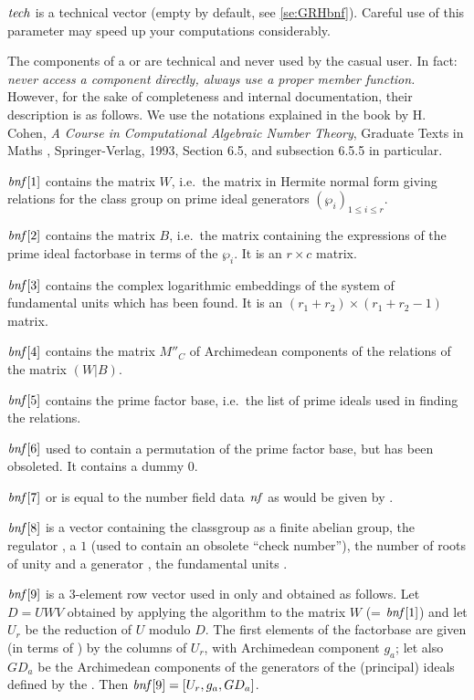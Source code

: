 $\hbox{\it tech\/}$ is a technical vector (empty by default, see \ref{se:GRHbnf}).
Careful use of this parameter may speed up your computations considerably.

\smallskip

The components of a  or  are technical and never used by
the casual user. In fact: \emph{never access a component directly, always use
a proper member function.} However, for the sake of completeness and internal
documentation, their description is as follows. We use the notations
explained in the book by H. Cohen, \emph{A Course in Computational Algebraic
Number Theory}, Graduate Texts in Maths , Springer-Verlag, 1993,
Section 6.5, and subsection 6.5.5 in particular.

$\hbox{\it bnf\/}[1]$ contains the matrix $W$, i.e.~the matrix in Hermite normal
form giving relations for the class group on prime ideal generators
$(\wp_i)_{1\le i\le r}$.

$\hbox{\it bnf\/}[2]$ contains the matrix $B$, i.e.~the matrix containing the
expressions of the prime ideal factorbase in terms of the $\wp_i$. It is an
$r\times c$ matrix.

$\hbox{\it bnf\/}[3]$ contains the complex logarithmic embeddings of the system of
fundamental units which has been found. It is an $(r_1+r_2)\times(r_1+r_2-1)$
matrix.

$\hbox{\it bnf\/}[4]$ contains the matrix $M''_C$ of Archimedean components of the
relations of the matrix $(W|B)$.

$\hbox{\it bnf\/}[5]$ contains the prime factor base, i.e.~the list of prime
ideals used in finding the relations.

$\hbox{\it bnf\/}[6]$ used to contain a permutation of the prime factor base, but
has been obsoleted. It contains a dummy $0$.

$\hbox{\it bnf\/}[7]$ or  is equal to the number field data
$\hbox{\it nf\/}$ as would be given by .

$\hbox{\it bnf\/}[8]$ is a vector containing the classgroup 
as a finite abelian group, the regulator , a $1$ (used to
contain an obsolete ``check number''), the number of roots of unity and a
generator , the fundamental units .

$\hbox{\it bnf\/}[9]$ is a 3-element row vector used in  only
and obtained as follows. Let $D = U W V$ obtained by applying the
 algorithm to the matrix $W$ (= $\hbox{\it bnf\/}[1]$) and
let $U_r$ be the reduction of $U$ modulo $D$. The first elements of the
factorbase are given (in terms of ) by the columns of $U_r$,
with Archimedean component $g_a$; let also $GD_a$ be the Archimedean
components of the generators of the (principal) ideals defined by the
. Then $\hbox{\it bnf\/}[9]=[U_r, g_a, GD_a]$.

